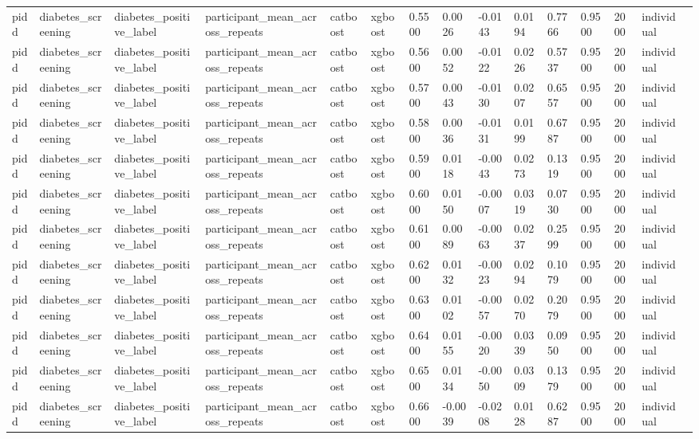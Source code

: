 \begin{tabular}{lllllllllllllll}
pidd & diabetes\_screening & diabetes\_positive\_label & participant\_mean\_across\_repeats & catboost & xgboost & 0.5500 & 0.0026 & -0.0143 & 0.0194 & 0.7766 & 0.9500 & 2000 & individual &  \\
pidd & diabetes\_screening & diabetes\_positive\_label & participant\_mean\_across\_repeats & catboost & xgboost & 0.5600 & 0.0052 & -0.0122 & 0.0226 & 0.5737 & 0.9500 & 2000 & individual &  \\
pidd & diabetes\_screening & diabetes\_positive\_label & participant\_mean\_across\_repeats & catboost & xgboost & 0.5700 & 0.0043 & -0.0130 & 0.0207 & 0.6557 & 0.9500 & 2000 & individual &  \\
pidd & diabetes\_screening & diabetes\_positive\_label & participant\_mean\_across\_repeats & catboost & xgboost & 0.5800 & 0.0036 & -0.0131 & 0.0199 & 0.6787 & 0.9500 & 2000 & individual &  \\
pidd & diabetes\_screening & diabetes\_positive\_label & participant\_mean\_across\_repeats & catboost & xgboost & 0.5900 & 0.0118 & -0.0043 & 0.0273 & 0.1319 & 0.9500 & 2000 & individual &  \\
pidd & diabetes\_screening & diabetes\_positive\_label & participant\_mean\_across\_repeats & catboost & xgboost & 0.6000 & 0.0150 & -0.0007 & 0.0319 & 0.0730 & 0.9500 & 2000 & individual &  \\
pidd & diabetes\_screening & diabetes\_positive\_label & participant\_mean\_across\_repeats & catboost & xgboost & 0.6100 & 0.0089 & -0.0063 & 0.0237 & 0.2599 & 0.9500 & 2000 & individual &  \\
pidd & diabetes\_screening & diabetes\_positive\_label & participant\_mean\_across\_repeats & catboost & xgboost & 0.6200 & 0.0132 & -0.0023 & 0.0294 & 0.1079 & 0.9500 & 2000 & individual &  \\
pidd & diabetes\_screening & diabetes\_positive\_label & participant\_mean\_across\_repeats & catboost & xgboost & 0.6300 & 0.0102 & -0.0057 & 0.0270 & 0.2079 & 0.9500 & 2000 & individual &  \\
pidd & diabetes\_screening & diabetes\_positive\_label & participant\_mean\_across\_repeats & catboost & xgboost & 0.6400 & 0.0155 & -0.0020 & 0.0339 & 0.0950 & 0.9500 & 2000 & individual &  \\
pidd & diabetes\_screening & diabetes\_positive\_label & participant\_mean\_across\_repeats & catboost & xgboost & 0.6500 & 0.0134 & -0.0050 & 0.0309 & 0.1379 & 0.9500 & 2000 & individual &  \\
pidd & diabetes\_screening & diabetes\_positive\_label & participant\_mean\_across\_repeats & catboost & xgboost & 0.6600 & -0.0039 & -0.0208 & 0.0128 & 0.6287 & 0.9500 & 2000 & individual &  \\

\end{tabular}
